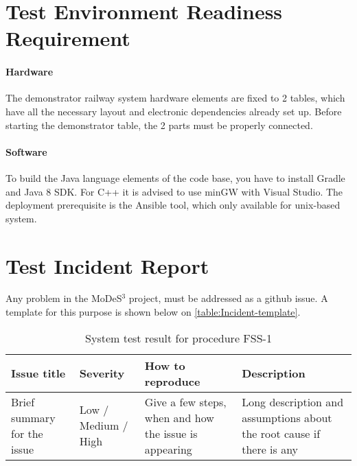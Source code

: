 \section{Test Environment Readiness Requirement}
\paragraph{Hardware} The demonstrator railway system hardware elements are fixed to 2 tables, which have all the necessary layout and electronic dependencies already set up. Before starting the demonstrator table, the 2 parts must be properly connected. 
\paragraph{Software} To build the Java language elements of the code base, you have to install Gradle and Java 8 SDK. For C++ it is advised to use minGW with Visual Studio. The deployment prerequisite is the Ansible tool, which only available for unix-based system.

\section{Test Incident Report} Any problem in the MoDeS$^3$ project, must be addressed as a github issue. A template for this purpose is shown below on \autoref{table:Incident-template}.
\begin{table}[H]
	\caption{System test result for procedure FSS-1}
	\label{table:Incident-template}
	\begin{center}
		\renewcommand{\arraystretch}{1.8}
		\begin{tabu} 
			to 0.9 \textwidth
			{ X[c] X[c] X[c] X[c] }
			\toprule
			Issue title                 & Severity            & How to reproduce                                      & Description                                                           \\ \midrule
			Brief summary for the issue & Low / Medium / High & Give a few steps, when and how the issue is appearing & Long description and assumptions about the root cause if there is any \\ \bottomrule
		\end{tabu}
	\end{center}
\end{table}
